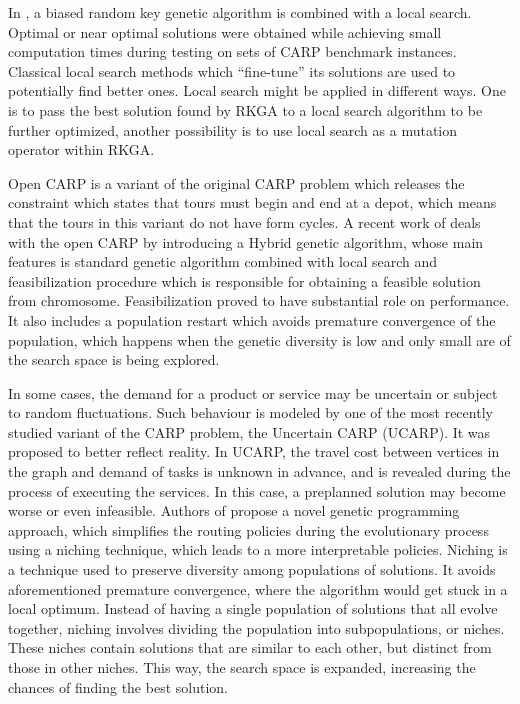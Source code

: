 \documentclass[twoside]{ctuthesis}
\theoremstyle{plain}
\theoremstyle{definition}
\theoremstyle{note}
\begin{document}
In \cite{martinez2011brkga}, a biased random key genetic algorithm is combined with a local search. Optimal or near optimal solutions were obtained while achieving small computation times during testing on sets of CARP benchmark instances. Classical local search methods which “fine-tune” its solutions are used to potentially find better ones. Local search might be applied in different ways. One is to pass the best solution found by RKGA to a local search algorithm to be further optimized, another possibility is to use local search as a mutation operator within RKGA.

Open CARP is a variant of the original CARP problem which releases the constraint which states that tours must begin and end at a depot, which means that the tours in this variant do not have form cycles. A recent work of \cite{arakaki2018hybrid} deals with the open CARP by introducing a Hybrid genetic algorithm, whose main features is standard genetic algorithm combined with local search and feasibilization procedure which is responsible for obtaining a feasible solution from chromosome. Feasibilization proved to have substantial role on performance. It also includes a population restart which avoids premature convergence of the population, which happens when the genetic diversity is low and only small are of the search space is being explored.

In some cases, the demand for a product or service may be uncertain or subject to random fluctuations. Such behaviour is modeled by one of the most recently studied variant of the CARP problem, the Uncertain CARP (UCARP). It was proposed to better reflect reality. In UCARP, the travel cost between vertices in the graph and demand of tasks is unknown in advance, and is revealed during the process of executing the services. In this case, a preplanned solution may become worse or even infeasible. Authors of \cite{wang2021genetic} propose a novel genetic programming approach, which simplifies the routing policies during the evolutionary process using a niching technique, which leads to a more interpretable policies. Niching is a technique used to preserve diversity among populations of solutions. It avoids aforementioned premature convergence, where the algorithm would get stuck in a local optimum. Instead of having a single population of solutions that all evolve together, niching involves dividing the population into subpopulations, or niches. These niches contain solutions that are similar to each other, but distinct from those in other niches. This way, the search space is expanded, increasing the chances of finding the best solution.
\end{document}
